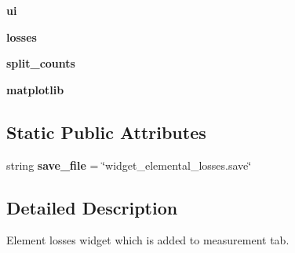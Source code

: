 \begin{DoxyCompactItemize}
\item 
\hypertarget{classDialogs_1_1ElementLossesDialog_1_1ElementLossesWidget_acd9a2370199adf25936817216fdc6f0d}{{\bfseries ui}}\label{classDialogs_1_1ElementLossesDialog_1_1ElementLossesWidget_acd9a2370199adf25936817216fdc6f0d}

\item 
\hypertarget{classDialogs_1_1ElementLossesDialog_1_1ElementLossesWidget_a3005579119e7ae7bbdb4617e0fc85ed9}{{\bfseries losses}}\label{classDialogs_1_1ElementLossesDialog_1_1ElementLossesWidget_a3005579119e7ae7bbdb4617e0fc85ed9}

\item 
\hypertarget{classDialogs_1_1ElementLossesDialog_1_1ElementLossesWidget_af40daea8f02908f07ae7956cd81e2fe2}{{\bfseries split\-\_\-counts}}\label{classDialogs_1_1ElementLossesDialog_1_1ElementLossesWidget_af40daea8f02908f07ae7956cd81e2fe2}

\item 
\hypertarget{classDialogs_1_1ElementLossesDialog_1_1ElementLossesWidget_aac2977387cef7e5be90e8eacc43a234c}{{\bfseries matplotlib}}\label{classDialogs_1_1ElementLossesDialog_1_1ElementLossesWidget_aac2977387cef7e5be90e8eacc43a234c}

\end{DoxyCompactItemize}
\subsection*{Static Public Attributes}
\begin{DoxyCompactItemize}
\item 
\hypertarget{classDialogs_1_1ElementLossesDialog_1_1ElementLossesWidget_ac90fe6871133f42b069e86f9c40dee2d}{string {\bfseries save\-\_\-file} = \char`\"{}widget\-\_\-elemental\-\_\-losses.\-save\char`\"{}}\label{classDialogs_1_1ElementLossesDialog_1_1ElementLossesWidget_ac90fe6871133f42b069e86f9c40dee2d}

\end{DoxyCompactItemize}


\subsection{Detailed Description}
\begin{DoxyVerb}Element losses widget which is added to measurement tab.
\end{DoxyVerb}
 

